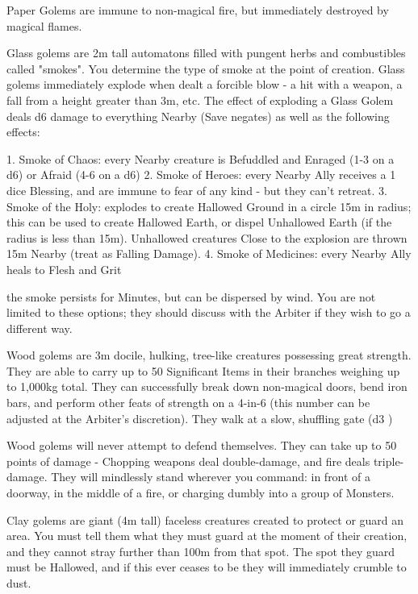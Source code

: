 Paper Golems are immune to non-magical fire, but immediately destroyed by magical flames.


Glass golems are 2m tall automatons filled with pungent herbs and combustibles called "smokes".  You determine the type of smoke at the point of creation. Glass golems immediately explode when dealt a forcible blow - a hit with a weapon, a fall from a height greater than 3m, etc.  The effect of exploding a Glass Golem deals d6 damage to everything Nearby (Save negates) as well as the following effects:

1. Smoke of Chaos:  every Nearby creature is Befuddled and Enraged (1-3 on a d6) or Afraid (4-6 on a d6)
2. Smoke of Heroes:  every Nearby Ally receives a 1 dice Blessing, and are immune to fear of any kind - but they can't retreat.
3. Smoke of the Holy: explodes to create Hallowed Ground in a circle 15m in radius; this can be used to create Hallowed Earth, or dispel Unhallowed Earth (if the radius is less than 15m).  Unhallowed creatures Close to the explosion are thrown 15m Nearby (treat as Falling Damage).
4. Smoke of Medicines: every Nearby Ally heals to \MAX Flesh and Grit

the smoke persists for Minutes, but can be dispersed by wind.  You are not limited to these options; they should discuss with the Arbiter if they wish to go a different way.



Wood golems are 3m docile, hulking, tree-like creatures possessing great strength. They are able to carry up to 50 Significant Items in their branches weighing up to 1,000kg total.  They can successfully break down non-magical doors, bend iron bars, and perform other feats of strength on a 4-in-6 (this number can be adjusted at the Arbiter's discretion).  They walk at a slow, shuffling gate (d3 \MD)

Wood golems will never attempt to defend themselves.  They can take up to 50 points of damage - Chopping weapons deal double-damage, and fire deals triple-damage.  They will mindlessly stand wherever you command: in front of a doorway, in the middle of a fire, or charging dumbly into a group of Monsters.


Clay golems are giant (4m tall) faceless creatures created to protect or guard an area.  You must tell them what they must guard at the moment of their creation, and they cannot stray further than 100m from that spot.  The spot they guard must be Hallowed, and if this ever ceases to be they will immediately crumble to dust.

